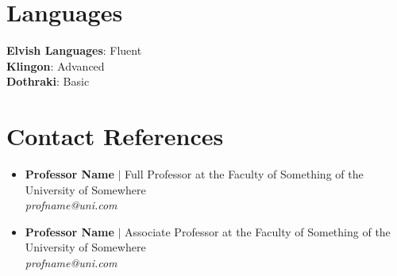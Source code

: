 \documentclass[letterpaper,11pt]{article}
\newcommand{\resumeRefHeading}[3]{
	\vspace{2pt}\item
	\textbf{#1} $|$ #2 \\
	\textit{#3}
	\vspace{-7pt}
}
\newcommand{\resumeSubHeadingListStart}{\begin{itemize}[leftmargin=0.15in, label={}]}
\newcommand{\resumeSubHeadingListEnd}{\end{itemize}}
\begin{document}
	
	
	
	\section{Languages}
	\begin{itemize}[leftmargin=0.15in, label={}]
		\small{\item{
				\textbf{Elvish Languages}{: Fluent} \\
				\textbf{Klingon}{: Advanced} \\
				\textbf{Dothraki}{: Basic}
		}}
	\end{itemize}
	
	
	
	
	\section{Contact References}
	\resumeSubHeadingListStart
	
	\resumeRefHeading
	{Professor Name}
	{Full Professor at the Faculty of Something of the University of Somewhere}
	{profname@uni.com}
	
	\resumeRefHeading
	{Professor Name}
	{Associate Professor at the Faculty of Something of the University of Somewhere}
	{profname@uni.com}
	
	\resumeSubHeadingListEnd
	
	
\end{document}
